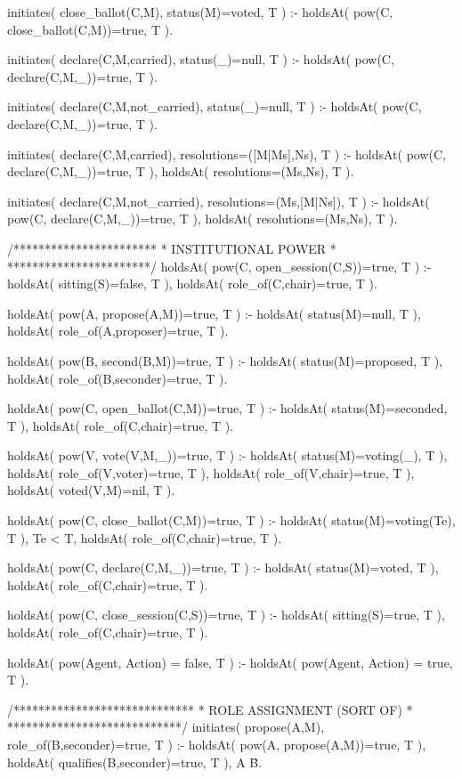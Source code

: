 \begin{prologinline}[caption=Implementation of RONR in Prolog]
initiates( close_ballot(C,M), status(M)=voted, T ) :-
	holdsAt( pow(C, close_ballot(C,M))=true, T ).

initiates( declare(C,M,carried), status(_)=null, T ) :-
	holdsAt( pow(C, declare(C,M,_))=true, T ).

initiates( declare(C,M,not_carried), status(_)=null, T ) :-
	holdsAt( pow(C, declare(C,M,_))=true, T ).

initiates( declare(C,M,carried), resolutions=([M|Ms],Ns), T ) :-
	holdsAt( pow(C, declare(C,M,_))=true, T ),
	holdsAt( resolutions=(Ms,Ns), T ).

initiates( declare(C,M,not_carried), resolutions=(Ms,[M|Ns]), T ) :-
	holdsAt( pow(C, declare(C,M,_))=true, T ),
	holdsAt( resolutions=(Ms,Ns), T ).

/***********************
 * INSTITUTIONAL POWER *
 ***********************/
holdsAt( pow(C, open_session(C,S))=true, T ) :-
	holdsAt( sitting(S)=false, T ),
	holdsAt( role_of(C,chair)=true, T ).

holdsAt( pow(A, propose(A,M))=true, T ) :-
	holdsAt( status(M)=null, T ),
	holdsAt( role_of(A,proposer)=true, T ).

holdsAt( pow(B, second(B,M))=true, T ) :-
	holdsAt( status(M)=proposed, T ),
	holdsAt( role_of(B,seconder)=true, T ).

holdsAt( pow(C, open_ballot(C,M))=true, T ) :-
	holdsAt( status(M)=seconded, T ),
	holdsAt( role_of(C,chair)=true, T ).

holdsAt( pow(V, vote(V,M,_))=true, T ) :-
	holdsAt( status(M)=voting(_), T ),
	holdsAt( role_of(V,voter)=true, T ),
	\+ holdsAt( role_of(V,chair)=true, T ),
	holdsAt( voted(V,M)=nil, T ).

holdsAt( pow(C, close_ballot(C,M))=true, T ) :-
	holdsAt( status(M)=voting(Te), T ), Te < T,
	holdsAt( role_of(C,chair)=true, T ).

holdsAt( pow(C, declare(C,M,_))=true, T ) :-
	holdsAt( status(M)=voted, T ),
	holdsAt( role_of(C,chair)=true, T ).

holdsAt( pow(C, close_session(C,S))=true, T ) :-
	holdsAt( sitting(S)=true, T ),
	holdsAt( role_of(C,chair)=true, T ).

holdsAt( pow(Agent, Action) = false, T ) :-
	\+ holdsAt( pow(Agent, Action) = true, T ).

/*****************************
 * ROLE ASSIGNMENT (SORT OF) *
 ****************************/
initiates( propose(A,M), role_of(B,seconder)=true, T ) :-
	holdsAt( pow(A, propose(A,M))=true, T ),
	holdsAt( qualifies(B,seconder)=true, T ),
	A \= B.


\end{prologinline}
